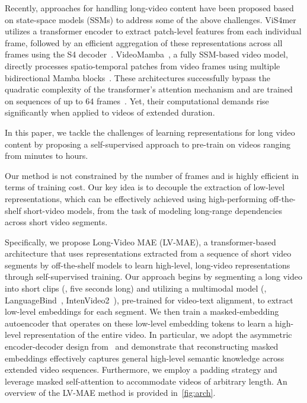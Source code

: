 Recently, approaches for handling long-video content have been proposed based on state-space models (SSMs) to address some of the above challenges. ViS4mer~\cite{islam2022long} utilizes a transformer encoder to extract patch-level features from each individual frame, followed by an efficient aggregation of these representations across all frames using the S4 decoder~\cite{gu2022efficiently}. VideoMamba~\cite{li2024videomamba}, a fully SSM-based video model, directly processes spatio-temporal patches from video frames using multiple bidirectional Mamba blocks~\cite{Zhu2024VisionME}. 
These architectures successfully bypass the quadratic complexity of the transformer's attention mechanism and are trained on sequences of up to 64 frames~\cite{islam2022long, li2024videomamba}. Yet, their computational demands rise significantly when applied to videos of extended duration.





In this paper, we tackle the challenges of learning representations for long video content by proposing a self-supervised approach to pre-train on videos ranging from minutes to hours.

Our method is not constrained by the number of frames and is highly efficient in terms of training cost.
Our key idea is to decouple the extraction of low-level representations, which can be effectively achieved using high-performing off-the-shelf short-video models, from the task of modeling long-range dependencies across short video segments. 


Specifically, we propose Long-Video MAE (LV-MAE), a transformer-based architecture that uses representations extracted from a sequence of short video segments by off-the-shelf models to learn high-level, long-video representations through self-supervised training.
Our approach begins by segmenting a long video into short clips (\eg, five seconds long) and utilizing a multimodal model (\eg, LanguageBind~\cite{zhu2024languagebind}, IntenVideo2~\cite{Wang2024InternVideo2SV}), pre-trained for video-text alignment, to extract low-level embeddings for each segment. We then train a masked-embedding autoencoder that operates on these low-level embedding tokens to learn a high-level representation of the entire video.
In particular, we adopt the asymmetric encoder-decoder design from~\cite{he2022masked} and demonstrate that reconstructing masked embeddings effectively captures general high-level semantic knowledge across extended video sequences.
Furthermore, we employ a padding strategy and leverage masked self-attention to accommodate videos of arbitrary length.
An overview of the LV-MAE method is provided in~\cref{fig:arch}.


